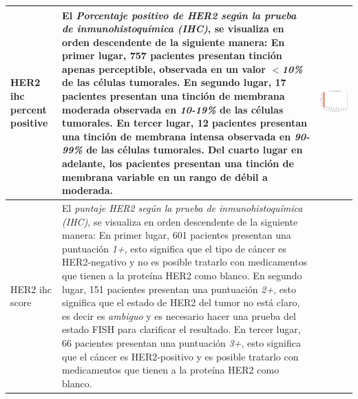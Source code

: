 \begin{table}[!htb]
\begin{threeparttable}
\begin{tabular}{p{2.5cm} p{7cm} p{6.5cm}}
			HER2 ihc percent positive
			& El \textit{Porcentaje positivo de HER2 según la prueba de inmunohistoquímica (IHC)}, se visualiza en orden descendente de la siguiente manera: En primer lugar, 757 pacientes presentan tinción apenas perceptible, observada en un valor $<$\textit{10\%} de las células tumorales. En segundo lugar, 17 pacientes presentan una tinción de membrana moderada observada en \textit{10-19\%} de las células tumorales. En tercer lugar, 12 pacientes presentan una tinción de membrana intensa observada en \textit{90-99\%} de las células tumorales. Del cuarto lugar en adelante, los pacientes presentan una tinción de membrana variable en un rango de débil a moderada.
			& \begin{center}\includegraphics[width=1\linewidth]{NOTEBOOK/IMAGENES_DESCRIPTIVAS/16_her_2_ihc_percent_positive}\end{center}
			\\ \hline
			
			HER2 ihc score
			& El \textit{puntaje HER2 según la prueba de inmunohistoquímica (IHC)}, se visualiza en orden descendente de la siguiente manera: En primer lugar, 601 pacientes presentan una puntuación \textit{1+}, esto significa que el tipo de cáncer es HER2-negativo y no es posible tratarlo con medicamentos que tienen a la proteína HER2 como blanco. En segundo lugar, 151 pacientes presentan una puntuación \textit{2+}, esto significa que el estado de HER2 del tumor no está claro, es decir es \textit{ambiguo} y es necesario hacer una prueba del estado FISH para clarificar el resultado. En tercer lugar, 66 pacientes presentan una puntuación \textit{3+}, esto significa que el cáncer es HER2-positivo y es posible tratarlo con medicamentos que tienen a la proteína HER2 como blanco.
			

\end{tabular}
\end{threeparttable}
\end{table}
